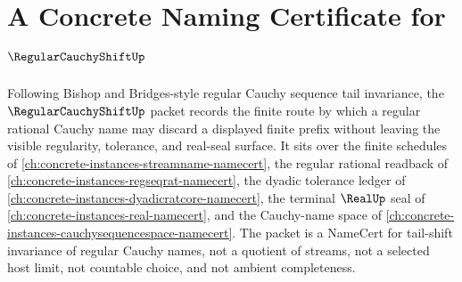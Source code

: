 \chapter{A Concrete Naming Certificate for $\RegularCauchyShiftUp$}
\label{ch:concrete-instances-regular-cauchy-shift-namecert}

Following Bishop and Bridges-style regular Cauchy sequence tail invariance, the $\RegularCauchyShiftUp$ packet records the finite route by which a regular rational Cauchy name may discard a displayed finite prefix without leaving the visible regularity, tolerance, and real-seal surface. It sits over the finite schedules of \autoref{ch:concrete-instances-streamname-namecert}, the regular rational readback of \autoref{ch:concrete-instances-regseqrat-namecert}, the dyadic tolerance ledger of \autoref{ch:concrete-instances-dyadicratcore-namecert}, the terminal $\RealUp$ seal of \autoref{ch:concrete-instances-real-namecert}, and the Cauchy-name space of \autoref{ch:concrete-instances-cauchysequencespace-namecert}. The packet is a NameCert for tail-shift invariance of regular Cauchy names, not a quotient of streams, not a selected host limit, not countable choice, and not ambient completeness.

